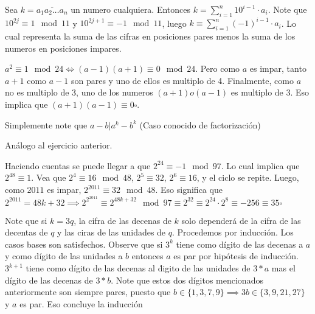 \begin{sol}
	Sea $k = \overline{a_{1}a_{2}\dots a_{n}}$ un numero cualquiera. Entonces $k = \sum_{i = 1}^{n} 10^{i-1} \cdot a_{i}$. Note que $10^{2j} \equiv 1 \mod 11 $ y $10^{2j+1} \equiv -1 \mod 11$, luego $k \equiv \sum_{i=1}^{n}(-1)^{i-1} \cdot a_{i}$. Lo cual representa la suma de las cifras en posiciones pares menos la suma de los numeros en posiciones impares.
\end{sol}


\begin{sol}
	$a^2 \equiv 1 \mod 24 \iff (a-1)(a+1) \equiv 0 \mod 24$. Pero como $a$ es impar, tanto $a+1$ como $a-1$ son pares y uno de ellos es multiplo de 4. Finalmente, como $a$ no es multiplo de 3, uno de los numeros $(a+1) o (a-1)$ es multiplo de 3. Eso implica que $(a+1)(a-1) \equiv 0 \square$.
\end{sol}

\begin{sol}
	Simplemente note que $a-b |a^{k}-b^{k}$ (Caso conocido de factorizaci\'on)
\end{sol}

\begin{sol}
	An\'alogo al ejercicio anterior.
\end{sol}

\begin{sol}
	Haciendo cuentas se puede llegar a que $2^{24} \equiv -1 \mod 97$. Lo cual implica que $2^{48} \equiv 1$. Vea que $2^4 \equiv 16 \mod 48$, $2^5 \equiv 32$, $2^6 \equiv 16$, y el ciclo se repite. Luego, como $2011$ es impar, $2^{2011} \equiv 32 \mod 48$. Eso significa que $2^{2011} = 48k +32 \implies 2^{2^{2011}} \equiv 2^{48k+32} \mod 97 \equiv 2^{32} \equiv 2^{24} \cdot 2^8 \equiv -256 \equiv 35 \square$
\end{sol}

\begin{sol}
	Note que si $k = 3q$, la cifra de las decenas de $k$ solo depender\'a de la cifra de las decentas de $q$ y las ciras de las unidades de $q$. Procedemos por inducci\'on. Los casos bases son satisfechos. Observe que si $3^k$ tiene como d\'igito de las decenas a $a$ y como d\'igito de las unidades a $b$ entonces $a$ es par por hip\'otesis de inducci\'on. $3^{k+1} $ tiene como d\'igito de las decenas al \'digito de las unidades de $3*a$ mas el d\'igito de las decenas de $3*b$. Note que estos dos d\'igitos mencionados anteriormente son siempre pares, puesto que $b\in \{1, 3, 7, 9\} \implies 3b \in \{3, 9, 21, 27\}$ y $a$ es par. Eso concluye la inducci\'on
\end{sol}



